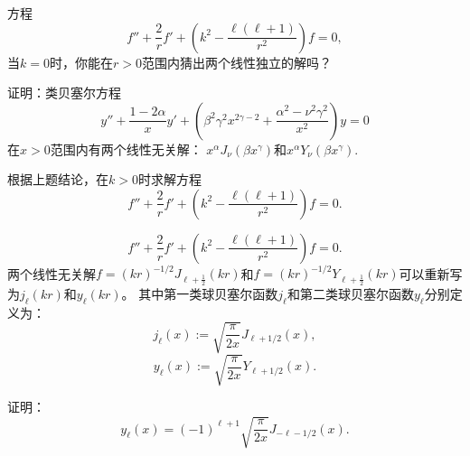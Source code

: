 \documentclass[CJK]{beamer}
\begin{document}
\begin{frame}
  \bch
  
  方程
  $$ f''+\frac{2}{r}f'+\left(k^2-\frac{\ell(\ell+1)}{r^2}\right) f = 0, $$
  当$k=0$时，你能在$r>0$范围内猜出两个线性独立的解吗？

  \ech
\end{frame}


\begin{frame}
  \bch
  
  证明：类贝塞尔方程
  $$ y''+\frac{1-2\alpha}{x} y' + \left(\beta^2\gamma^2x^{2\gamma-2}+\frac{\alpha^2-\nu^2\gamma^2}{x^2}\right)y=0 $$
  在$x>0$范围内有两个线性无关解： $x^{\alpha}J_\nu(\beta x^\gamma)$和$x^{\alpha}Y_\nu(\beta x^\gamma)$.
  \ech
\end{frame}


\begin{frame}
  \bch

  根据上题结论，在$k>0$时求解方程
  $$ f''+\frac{2}{r}f'+\left(k^2-\frac{\ell(\ell+1)}{r^2}\right) f = 0. $$
  \ech
\end{frame}

\begin{frame}
  \bch
  $$ f''+\frac{2}{r}f'+\left(k^2-\frac{\ell(\ell+1)}{r^2}\right) f = 0. $$  
  两个线性无关解$f =  (kr)^{-1/2}J_{\ell+\frac{1}{2}}(kr)$和$f=(kr)^{-1/2}Y_{\ell+\frac{1}{2}}(kr)$可以重新写为$ j_\ell(kr)$和$y_{\ell}(kr)$。
  其中第一类球贝塞尔函数$j_\ell$和第二类球贝塞尔函数$y_\ell$分别定义为：{\blue
  $$ j_\ell(x) :=\sqrt{ \frac{\pi}{2x}} J_{\ell+1/2}(x), $$
  $$ y_\ell(x) :=\sqrt{ \frac{\pi}{2x}} Y_{\ell+1/2}(x). $$  }

  
  \ech
\end{frame}


\begin{frame}
  \bch
  \ech
\end{frame}


\begin{frame}
  \bch
  \ech
\end{frame}

\begin{frame}
  \bch
  
  证明：
  $$y_\ell(x) = (-1)^{\ell+1}\sqrt{\frac{\pi}{2x}}J_{-\ell-1/2}(x).$$
  \ech
\end{frame}
\end{document}
